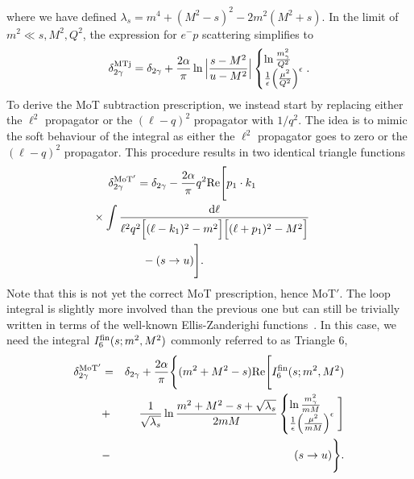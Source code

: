 where we have defined $\lambda_s = m^4 + (M^2 - s)^2 - 2 m^2 (M^2 + s)$.
In the limit of $m^2\ll s,M^2,Q^2$, the expression for $e^- p$ scattering simplifies to
    \begin{equation}
    \delta_{2\gamma}^{\rm MTj} = \delta_{2\gamma} +
    \frac{2 \alpha}{\pi}
        \ln\Big|\frac{s - M^2}{u - M^2}\Big|
    \begin{cases} \ln\frac{m_\gamma^2}{Q^2} \\ \frac1{\epsilon}\Big(\frac{\mu^2}{Q^2}\Big)^\epsilon \end{cases}\!\!\!\!\!\!
    .
\end{equation}
To derive the MoT subtraction prescription, we instead start by replacing either the $\ell^2$ propagator or the $(\ell-q)^2$ propagator with $1/q^2$.
The idea is to mimic the soft behaviour of the integral as either the $\ell^2$ propagator goes to zero or the $(\ell-q)^2$ propagator.
This procedure results in two identical triangle functions
    \begin{align}
    &\delta_{2\gamma}^{\rm MoT'} = \delta_{2\gamma} -
        \frac{2\alpha}{\pi} q^2 \Re\Bigg[p_1\cdot k_1 \nn\\
      &  \hspace{-0.5cm}\times\int  \frac{\dd \ell}{
            \ell^2
            q^2
            \Big[(\ell-k_1)^2-m^2\Big]
            \Big[(\ell+p_1)^2-M^2\Big]
        } \nn\\&\qquad\quad - (s\rightarrow u)\Bigg].
        \label{eq:motorgi}
\end{align}
Note that this is not yet the correct MoT prescription, hence {\rm MoT$'$}.
The loop integral is slightly more involved than the previous one but can still be trivially written in terms of the well-known Ellis-Zanderighi functions~\cite{Ellis:2007qk}.
In this case, we need the integral $I_6^{\rm fin}(s;m^2,M^2)$ commonly referred to as Triangle 6,
\begin{eqnarray}
    \delta_{2\gamma}^{\rm MoT'} &=& \delta_{2\gamma} +
        \frac{2 \alpha}{\pi} \Bigg\{
            (m^2 + M^2 - s) {\rm Re}\Bigg[
                I_6^{\rm fin}(s;m^2,M^2) \nonumber\\
                &+& \frac1{\sqrt{\lambda_s}}\ln\frac{m^2+M^2-s + \sqrt{\lambda_s}}{2mM} 
            \begin{cases} \ln\frac{m_\gamma^2}{mM} \\ \frac1{\epsilon}\Big(\frac{\mu^2}{mM}\Big)^\epsilon \end{cases}\!\!\!\!\!\!\Bigg]\nonumber\\
        &-& (s\rightarrow u)\Bigg\}.
\end{eqnarray}

